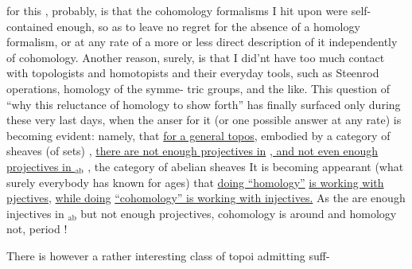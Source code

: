 for this , probably,  is that the cohomology formalisms I hit upon were
self-contained enough,  so as to leave no regret for the absence of a
homology formalism,  or at any rate of a more or less direct description
of it independently of cohomology.  Another reason,  surely,  is that I
did'nt have too much contact with topologists and homotopists and their
everyday  tools,  such as Steenrod operations,  homology of the symme-%
tric groups,  and the like.  This question of ``why this reluctance of
homology to show forth''  has finally  surfaced only during these very
last days,  when the anser for it (or one possible answer at any rate) is
becoming evident:  namely,  that \uline{for a general topos},  embodied by a
category of sheaves (of sets)  ,  \uline{there are not enough projectives in}
\uline{ ,  and not even enough projectives in $_{\mathrm{ab}}$} ,  the category of abelian
sheaves  It is becoming appearant (what surely everybody has known for
ages)  that  \uline{doing ``homology''} \uline{is working with pjectives},  \uline{while doing}
\uline{``cohomology'' is working with injectives.}  As the are enough injectives
in $_{\mathrm{ab}}$  but not enough projectives,  cohomology is around and homology
not,  period !

There is however a rather interesting class of topoi admitting suff-%


